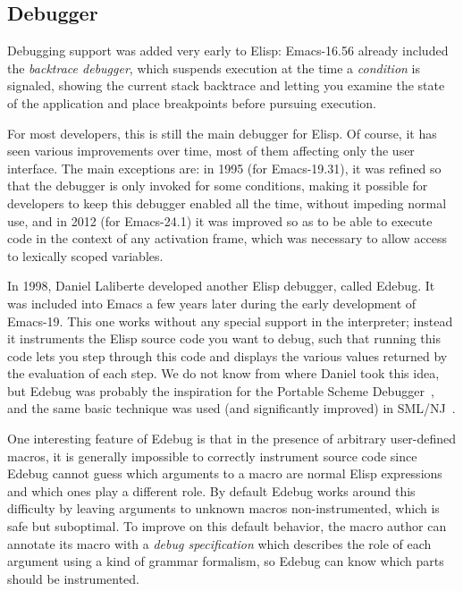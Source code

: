 \documentclass[format=acmsmall, review=false, screen=true]{acmart}
\newcommand \Elisp {Elisp}
\begin{document}
\subsection{Debugger}

Debugging support was added very early to \Elisp: Emacs-16.56 already
included the \emph{backtrace debugger}, which suspends execution at the time
a \emph{condition} is signaled, showing the current stack backtrace and
letting you examine the state of the application and place breakpoints
before pursuing execution.

For most developers, this is still the main debugger for \Elisp{}.
Of course, it has seen various improvements over time, most of them
affecting only the user interface.  The main exceptions are:
in 1995 (for Emacs-19.31), it was refined so that the debugger is only
invoked for some conditions, making it possible for developers to keep this
debugger enabled all the time, without impeding normal use, and in 2012
(for Emacs-24.1) it was improved so as to be able to execute code in the
context of any activation frame, which was necessary to allow access to
lexically scoped variables.

In 1998, Daniel Laliberte developed another \Elisp{} debugger, called
Edebug.  It was included into Emacs a few years later during the early
development of Emacs-19.  This one works without any special support in the
interpreter; instead it instruments the \Elisp{} source code you want to
debug, such that running this code lets you step through this code and
displays the various values returned by the evaluation of each step.  We do
not know from where Daniel took this idea, but Edebug was probably the
inspiration for the Portable Scheme Debugger~\cite{Kellomaki93}, and the
same basic technique was used (and significantly improved) in
SML/NJ~\cite{Tolmach90}.

One interesting feature of Edebug is that in the presence of arbitrary
user-defined macros, it is generally impossible to correctly instrument
source code since Edebug cannot guess which arguments to a macro are normal
\Elisp{} expressions and which ones play a different role.  By default
Edebug works around this difficulty by leaving arguments to unknown macros
non-instrumented, which is safe but suboptimal.  To improve on this default
behavior, the macro author can annotate its macro with a \emph{debug
  specification} which describes the role of each argument using a kind of
grammar formalism, so Edebug can know which parts should be instrumented.
\end{document}
